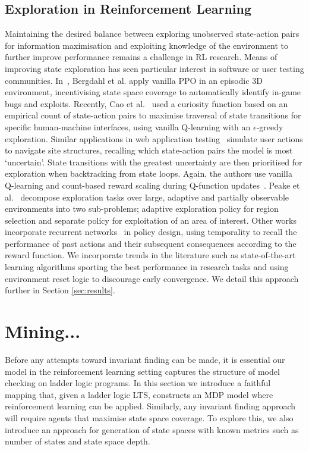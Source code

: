 \documentclass[runningheads]{llncs}
\begin{document}
\subsection{Exploration in Reinforcement Learning} 
Maintaining the desired balance between exploring unobserved state-action pairs for information maximisation and exploiting knowledge of the environment to further improve performance remains a challenge in RL research. Means of improving state exploration has seen particular interest in software or user testing communities. In~\cite{9231552}, Bergdahl et al. apply vanilla PPO in an episodic 3D environment, incentivising state space coverage to automatically identify in-game bugs and exploits. Recently, Cao et al.~\cite{9678703} used a curiosity function based on an empirical count of state-action pairs to maximise traversal of state transitions for specific human-machine interfaces, using vanilla Q-learning with an $\epsilon$-greedy exploration. Similar applications in web application testing~\cite{9402046} simulate user actions to navigate site structures, recalling which state-action pairs the model is most `uncertain'. State transitions with the greatest uncertainty are then prioritised for exploration when backtracking from state loops. Again, the authors use vanilla Q-learning and count-based reward scaling during Q-function updates~\cite{tang2017exploration}. Peake et al.~\cite{9476756} decompose exploration tasks over large, adaptive and partially observable environments into two sub-problems; adaptive exploration policy for region selection and separate policy for exploitation of an area of interest. Other works~\cite{s21041067} incorporate recurrent networks~\cite{medsker2001recurrent} in policy design, using temporality to recall the performance of past actions and their subsequent consequences according to the reward function. We incorporate trends in the literature such as state-of-the-art learning algorithms sporting the best performance in research tasks and using environment reset logic to discourage early convergence. We detail this approach further in Section \ref{sec:results}.


\section{Mining...} \label{sec:mapping_fm_to_ml}
Before any attempts toward invariant finding can be made, it is essential our model in the reinforcement learning setting captures the structure of model checking on ladder logic programs. In this section we introduce a faithful mapping that, given a ladder logic LTS, constructs an MDP model where reinforcement learning can be applied. Similarly, any invariant finding approach will require agents that maximise state space coverage. To explore this, we also introduce an approach for generation of state spaces with known metrics such as number of states and state space depth.
\end{document}
